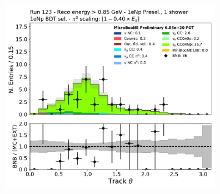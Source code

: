 \begin{figure}[H]
\begin{subfigure}{0.3\textwidth}
    \caption{}
    \end{subfigure}
    \begin{subfigure}{0.3\textwidth}
    \includegraphics[width=1.0\textwidth]{Sidebands/Figures/1eNp/HighEnergy/HiEext_NPOneShr_NPBDT_pi0e040/trk_theta.pdf}
    \caption{}
    \end{subfigure}
    \caption{} 
    \label{fig:HE_1eNp_9}
\end{figure}

